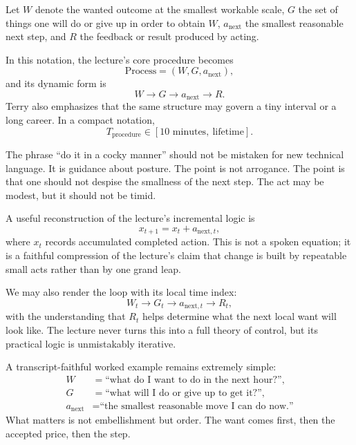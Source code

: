 \begin{definition}
Let \(W\) denote the wanted outcome at the smallest workable scale, \(G\) the set of things one will do or give up in order to obtain \(W\), \(a_{\text{next}}\) the smallest reasonable next step, and \(R\) the feedback or result produced by acting.
\end{definition}

In this notation, the lecture's core procedure becomes
\begin{equation}
\text{Process} = (W,G,a_{\text{next}}),
\end{equation}
and its dynamic form is
\begin{equation}
W \rightarrow G \rightarrow a_{\text{next}} \rightarrow R.
\end{equation}
Terry also emphasizes that the same structure may govern a tiny interval or a long career. In a compact notation,
\begin{equation}
T_{\text{procedure}} \in [10\text{ minutes},\ \text{lifetime}].
\end{equation}

The phrase ``do it in a cocky manner'' should not be mistaken for new technical language. It is guidance about posture. The point is not arrogance. The point is that one should not despise the smallness of the next step. The act may be modest, but it should not be timid.

A useful reconstruction of the lecture's incremental logic is
\begin{equation}
x_{t+1} = x_t + a_{\text{next},t},
\end{equation}
where \(x_t\) records accumulated completed action. This is not a spoken equation; it is a faithful compression of the lecture's claim that change is built by repeatable small acts rather than by one grand leap.

We may also render the loop with its local time index:
\begin{equation}
W_t \rightarrow G_t \rightarrow a_{\text{next},t} \rightarrow R_t,
\end{equation}
with the understanding that \(R_t\) helps determine what the next local want will look like. The lecture never turns this into a full theory of control, but its practical logic is unmistakably iterative.

A transcript-faithful worked example remains extremely simple:
\begin{align}
W &= \text{``what do I want to do in the next hour?''},\\
G &= \text{``what will I do or give up to get it?''},\\
a_{\text{next}} &= \text{``the smallest reasonable move I can do now.''}
\end{align}
What matters is not embellishment but order. The want comes first, then the accepted price, then the step.

